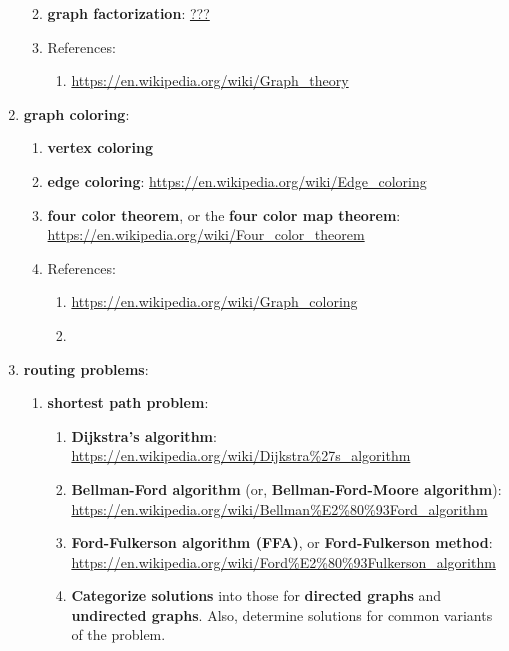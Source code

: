 \begin{enumerate}
\begin{enumerate}
\begin{enumerate}
		\end{enumerate}
	\item {\bf graph factorization}: \url{???}
	\item References: \vspace{-0.2cm}
		\begin{enumerate} \itemsep -2pt
		\item \url{https://en.wikipedia.org/wiki/Graph_theory}
		\end{enumerate}
	\end{enumerate}
\item {\bf graph coloring}: \vspace{-0.3cm}
	\begin{enumerate} \itemsep -2pt
	\item {\bf vertex coloring}
	\item {\bf edge coloring}: \url{https://en.wikipedia.org/wiki/Edge_coloring}
	\item {\bf four color theorem}, or the {\bf four color map theorem}: \url{https://en.wikipedia.org/wiki/Four_color_theorem}
	\item References: \vspace{-0.2cm}
		\begin{enumerate} \itemsep -2pt
		\item \url{https://en.wikipedia.org/wiki/Graph_coloring}
		\item \cite{Chartrand2009}
		\end{enumerate}
	\end{enumerate}
\item {\bf routing problems}: \vspace{-0.3cm}
	\begin{enumerate} \itemsep -2pt
	\item {\bf shortest path problem}: \vspace{-0.2cm}
		\begin{enumerate} \itemsep -2pt
		\item {\bf Dijkstra's algorithm}: \url{https://en.wikipedia.org/wiki/Dijkstra%27s_algorithm}
		\item {\bf Bellman-Ford algorithm} (or, {\bf Bellman-Ford-Moore algorithm}): \url{https://en.wikipedia.org/wiki/Bellman%E2%80%93Ford_algorithm}
		\item {\bf Ford-Fulkerson algorithm (FFA)}, or {\bf Ford-Fulkerson method}: \url{https://en.wikipedia.org/wiki/Ford%E2%80%93Fulkerson_algorithm}
		\item {\bf Categorize solutions} into those for {\bf directed graphs} and {\bf undirected graphs}. Also, determine solutions for common variants of the problem.

\end{enumerate}
\end{enumerate}
\end{enumerate}
